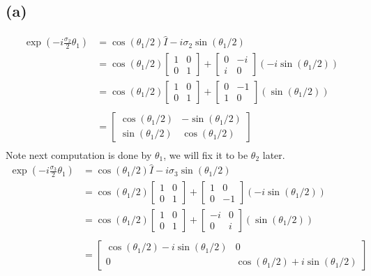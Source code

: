 \documentclass[letter, 10pts]{article}
\begin{document}
\subsection*{(a)} 
\begin{align*}
	\exp
	\left( - i \frac{\sigma_2}{2} \theta_1 \right) 
	&= 
	\cos ( \theta_1 / 2) \hat{I} - i \sigma_2 \sin ( \theta_1 / 2 ) 
	\\
	&= 
	\cos ( \theta_1 / 2) 
	\begin{bmatrix} 1 & 0 \\ 0 & 1 \end{bmatrix} + 
	\begin{bmatrix} 0 & -i \\ i & 0 \end{bmatrix} 
	(- i \sin (\theta_1 / 2 ))\\ 
	&= 
	\cos ( \theta_1 / 2) 
	\begin{bmatrix} 1 & 0 \\ 0 & 1 \end{bmatrix} + 
	\begin{bmatrix} 0 & -1 \\ 1 & 0 \end{bmatrix} 
	( \sin (\theta_1 / 2 ))\\ 
	\\ 
	&= 
	\begin{bmatrix} \cos ( \theta_1 / 2) & 
	- \sin (\theta_1 / 2) \\ 
\sin ( \theta_1 / 2) & \cos (\theta_1 /2 )\end{bmatrix} 
	\\
\end{align*}
Note next computation is done by $\theta_1$, we will fix it to be $\theta_2$ later. 
\begin{align*}
	\exp
	\left( - i \frac{\sigma_3}{2} \theta_1 \right) 
	&= 
	\cos ( \theta_1 / 2) \hat{I} - i \sigma_3 \sin ( \theta_1 / 2 ) 
	\\
	&= 
	\cos ( \theta_1 / 2) 
	\begin{bmatrix} 1 & 0 \\ 0 & 1 \end{bmatrix} + 
	\begin{bmatrix} 1 & 0 \\ 0 & -1 \end{bmatrix} 
	(- i \sin (\theta_1 / 2 ))\\ 
	&= 
	\cos ( \theta_1 / 2) 
	\begin{bmatrix} 1 & 0 \\ 0 & 1 \end{bmatrix} + 
	\begin{bmatrix} -i & 0 \\ 0 & i \end{bmatrix} 
	( \sin (\theta_1 / 2 ))\\ 
	\\ 
	&= 
	\begin{bmatrix} 
		\cos( \theta_1 / 2) - i \sin (\theta_1 / 2) & 0 
		\\ 
		0 & \cos ( \theta_1 / 2 ) + i \sin ( \theta_1 / 2)
	\end{bmatrix} 
\end{align*}
\end{document}
